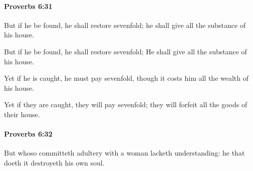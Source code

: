 		\paragraph{Proverbs 6:31} %
			\label{PROVERBS-6-31}

			But if he be found, he shall restore sevenfold; he shall give all the substance of his house.

			\begin{versebox}
					\item[BHS] 
					\item[ASV] But if he be found, he shall restore sevenfold; He shall give all the substance of his house.
					\item[NIV] Yet if he is caught, he must pay sevenfold, though it costs him all the wealth of his house.
					\item[NRSV] Yet if they are caught, they will pay sevenfold; they will forfeit all the goods of their house.
			\end{versebox}

		\paragraph{Proverbs 6:32} %
			\label{PROVERBS-6-32}

			But whoso committeth adultery with a woman lacketh understanding: he that doeth it destroyeth his own soul.

